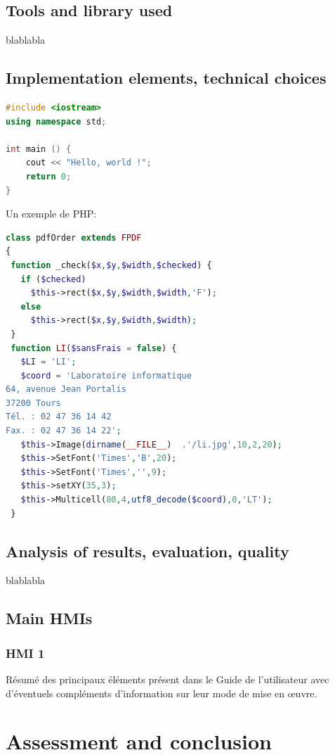 \documentclass{polytech/polytech}
\numberwithin{figure}{chapter}
\begin{document}
\section{Tools and library used}

blablabla

\section{Implementation elements, technical choices}

\begin{lstlisting}[language=C++]
#include <iostream>
using namespace std;

int main () {
    cout << "Hello, world !";
    return 0;
}
\end{lstlisting}

Un exemple de PHP:
\begin{lstlisting}[language=php]
class pdfOrder extends FPDF
{
 function _check($x,$y,$width,$checked) {
   if ($checked)
     $this->rect($x,$y,$width,$width,'F');
   else
     $this->rect($x,$y,$width,$width);
 }
 function LI($sansFrais = false) {
   $LI = 'LI';
   $coord = 'Laboratoire informatique
64, avenue Jean Portalis
37200 Tours
Tél. : 02 47 36 14 42
Fax. : 02 47 36 14 22';
   $this->Image(dirname(__FILE__)  .'/li.jpg',10,2,20);
   $this->SetFont('Times','B',20);
   $this->SetFont('Times','',9);
   $this->setXY(35,3);
   $this->Multicell(80,4,utf8_decode($coord),0,'LT');
 }
\end{lstlisting}

\section{Analysis of results, evaluation, quality}

blablabla


\section{Main HMIs}

\subsection{HMI 1}

Résumé des principaux éléments présent dans le Guide de l'utilisateur
avec d'éventuels compléments d'information sur leur mode de mise en œuvre.


\chapter{Assessment and conclusion}
\end{document}
